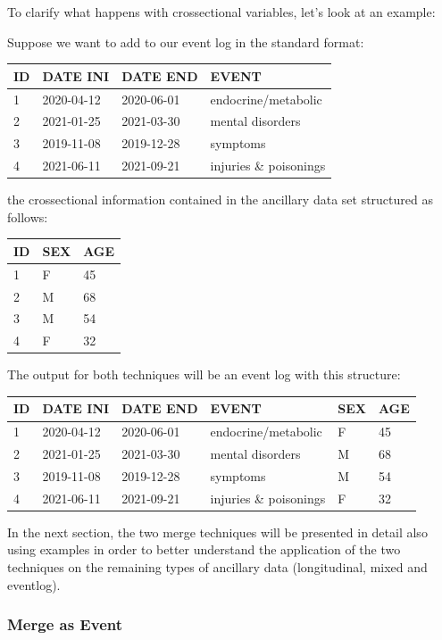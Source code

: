 \documentclass[
]{book}
\begin{document}
To clarify what happens with crossectional variables, let's look at an example:

Suppose we want to add to our event log in the standard format:

\begin{longtable}[]{@{}llll@{}}
\toprule
ID & DATE INI & DATE END & EVENT \\
\midrule
\endhead
1 & 2020-04-12 & 2020-06-01 & endocrine/metabolic \\
2 & 2021-01-25 & 2021-03-30 & mental disorders \\
3 & 2019-11-08 & 2019-12-28 & symptoms \\
4 & 2021-06-11 & 2021-09-21 & injuries \& poisonings \\
\bottomrule
\end{longtable}

the crossectional information contained in the ancillary data set structured as follows:

\begin{longtable}[]{@{}lll@{}}
\toprule
ID & SEX & AGE \\
\midrule
\endhead
1 & F & 45 \\
2 & M & 68 \\
3 & M & 54 \\
4 & F & 32 \\
\bottomrule
\end{longtable}

The output for both techniques will be an event log with this structure:

\begin{longtable}[]{@{}llllll@{}}
\toprule
ID & DATE INI & DATE END & EVENT & SEX & AGE \\
\midrule
\endhead
1 & 2020-04-12 & 2020-06-01 & endocrine/metabolic & F & 45 \\
2 & 2021-01-25 & 2021-03-30 & mental disorders & M & 68 \\
3 & 2019-11-08 & 2019-12-28 & symptoms & M & 54 \\
4 & 2021-06-11 & 2021-09-21 & injuries \& poisonings & F & 32 \\
\bottomrule
\end{longtable}

In the next section, the two merge techniques will be presented in detail also using examples in order to better understand the application of the two techniques on the remaining types of ancillary data (longitudinal, mixed and eventlog).

\hypertarget{merge-as-event}{%
\subsubsection{Merge as Event}\label{merge-as-event}}
\end{document}

